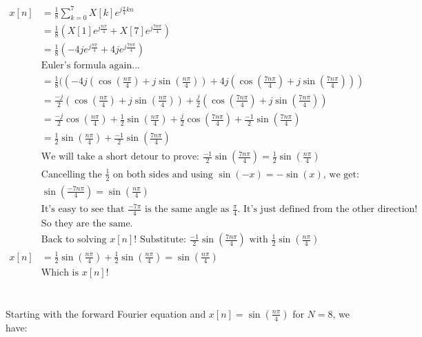 \documentclass{article}
\begin{document}
\begin{align*}
    x[n] &= \frac{1}{8}\sum_{k=0}^{7} X[k] e^{j\frac{\pi}{4}kn} \\
    &= \frac{1}{8}(X[1] e^{j\frac{n\pi}{4}} + X[7] e^{j\frac{7n\pi}{4}}) \\
    &= \frac{1}{8}(-4j e^{j\frac{n\pi}{4}} + 4j e^{j\frac{7n\pi}{4}}) \\
    &\textrm{Euler's formula again...} \\
    &= \frac{1}{8}((-4j (\cos(\frac{n\pi}{4}) + j \sin(\frac{n\pi}{4}))
    + 4j (\cos(\frac{7n\pi}{4}) + j \sin(\frac{7n\pi}{4}))) \\
    &= \frac{-j}{2} (\cos(\frac{n\pi}{4}) + j \sin(\frac{n\pi}{4}))
    + \frac{j}{2} (\cos(\frac{7n\pi}{4}) + j \sin(\frac{7n\pi}{4})) \\
    &= \frac{-j}{2} \cos(\frac{n\pi}{4}) + \frac{1}{2} \sin(\frac{n\pi}{4})
    + \frac{j}{2} \cos(\frac{7n\pi}{4}) + \frac{-1}{2} \sin(\frac{7n\pi}{4}) \\
    &= \frac{1}{2} \sin(\frac{n\pi}{4}) + \frac{-1}{2} \sin(\frac{7n\pi}{4}) \\
    &\textrm{We will take a short detour to prove: } \frac{-1}{2} \sin(\frac{7n\pi}{4}) = \frac{1}{2} \sin(\frac{n\pi}{4}) \\
    &\textrm{Cancelling the } \frac{1}{2} \textrm{ on both sides and using } \sin(-x) = -\sin(x) \textrm{, we get: } \\
    &\sin(\frac{-7n\pi}{4}) = \sin(\frac{n\pi}{4}) \\
    &\textrm{It's easy to see that } \frac{-7\pi}{4} \textrm{ is the same angle as } \frac{\pi}{4} \textrm{. It's just defined from the other direction!} \\
    &\textrm{So they are the same.} \\
    &\textrm{Back to solving } x[n] \textrm{! Substitute: } \frac{-1}{2} \sin(\frac{7n\pi}{4}) \textrm{ with } \frac{1}{2} \sin(\frac{n\pi}{4}) \\
    x[n] &= \frac{1}{2} \sin(\frac{n\pi}{4}) + \frac{1}{2} \sin(\frac{n\pi}{4}) = \sin(\frac{n\pi}{4})  \\
    &\textrm{Which is } x[n] \textrm{!}
\end{align*}

\section{}
Starting with the forward Fourier equation and $x[n] = \sin(\frac{n\pi}{4})$ for $N = 8$, we have:
\end{document}
